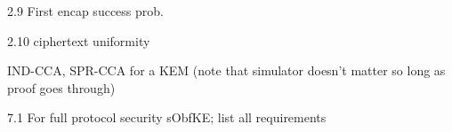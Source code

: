 \begin{definition}\label{def:first-encap-success}
    2.9 First encap success prob.
\end{definition}

\begin{definition}\label{def:ctxt-uniformity}
    2.10 ciphertext uniformity
\end{definition}

\begin{definition}\label{def:ind-spr-cca}
    IND-CCA, SPR-CCA for a KEM (note that simulator doesn't matter so long as proof goes through)
\end{definition}

\begin{theorem}\label{thm:s-obfuscated-keyex-security}
    7.1 For full protocol security sObfKE; list all requirements
\end{theorem}
